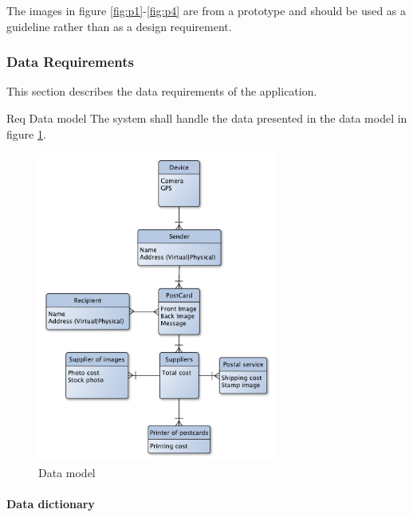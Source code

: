 \documentclass[10pt,a4paper]{article}
\begin{document}
	The images in figure \ref{fig:p1}-\ref{fig:p4} are from a  prototype and should be used as a guideline rather than as a design requirement.

\subsubsection{Data Requirements}
This section describes the data requirements of the application.


\begin {description}
	\item [Req \thesubsubsection {.\thedata} Data model] The system shall handle the data presented in the data model in figure \ref{fig:datamodel}.
\end{description}

\begin{figure}[h!]
\centering
\includegraphics[width=0.7\textwidth]{Data_figures/DataModel.pdf}
\caption{Data model}
\label{fig:datamodel}
\end{figure}
\FloatBarrier
\paragraph{Data dictionary}
\end{document}

